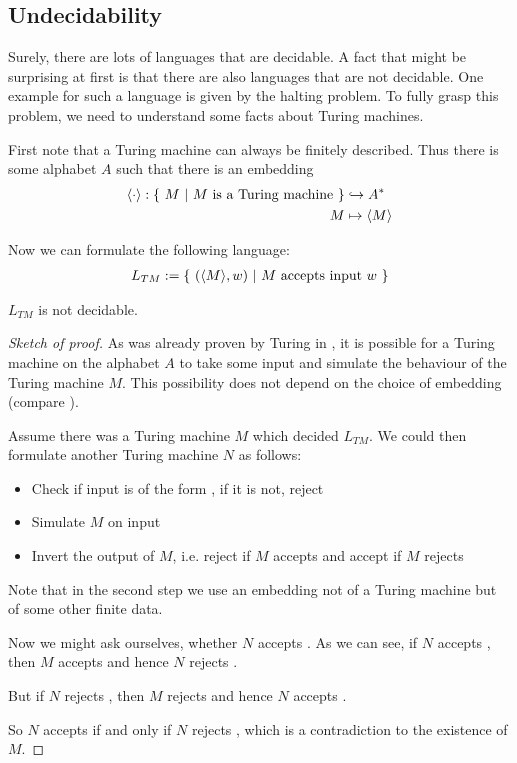 \subsection{Undecidability}

Surely, there are lots of languages that are decidable.
A fact that might be surprising at first is that there are also languages that are not decidable.
One example for such a language is given by the halting problem.
To fully grasp this problem, we need to understand some facts about Turing machines.

First note that a Turing machine can always be finitely described. Thus there is some alphabet $A$ such that there is an embedding
\begin{align*}
	\langle \cdot \rangle : \{~M~|~M~\text{is a Turing machine}~\} &\hookrightarrow A^* \\
	M &\mapsto \langle M \rangle
\end{align*}

Now we can formulate the following language:
\begin{align*}
	L_{TM} := \{~(\langle M \rangle,w)~|~M~\text{accepts input}~w~\}
\end{align*}

\begin{Theorem}
	$L_{TM}$ is not decidable.
\end{Theorem}
\begin{proof}[Sketch of proof]
	As was already proven by Turing in \cite{tur36}, it is possible for a Turing machine on the alphabet $A$ to take some input  and simulate the behaviour of the Turing machine $M$.
	This possibility does not depend on the choice of embedding (compare \cite{sip06}).

	Assume there was a Turing machine $M$ which decided $L_{TM}$.
	We could then formulate another Turing machine $N$ as follows:
	\begin{itemize}
		\item Check if input is of the form , if it is not, reject
		\item Simulate $M$ on input 
		\item Invert the output of $M$, i.e. reject if $M$ accepts and accept if $M$ rejects
	\end{itemize}
	Note that in the second step we use an embedding not of a Turing machine but of some other finite data.

	Now we might ask ourselves, whether $N$ accepts .
	As we can see, if $N$ accepts , then $M$ accepts  and hence $N$ rejects .
	
	But if $N$ rejects , then $M$ rejects  and hence $N$ accepts .

	So $N$ accepts  if and only if $N$ rejects , which is a contradiction to the existence of $M$.
\end{proof}

